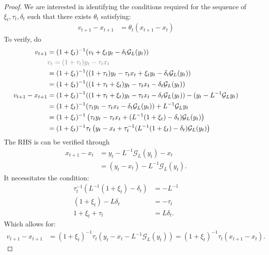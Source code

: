 \documentclass[12pt]{article}
\begin{document}
    \begin{proof}
        We are interested in identifying the conditions required for the sequence of $\xi_t, \tau_t, \delta_t$ such that there exists $\theta_t$ satisfying: 
        \begin{align*}
            v_{t + 1} - x_{t + 1} 
            &= \theta_t(x_{t + 1} - x_t)
        \end{align*}
        To verify, do 
        \begin{align*}
            v_{t + 1} &= 
            (1 + \xi_t)^{-1}(v_t + \xi_t y_t - \delta_t \mathcal G_L(y_t))
            \\
            & \textcolor{gray}{
                v_t = (1 + \tau_t)y_t - \tau_t x_t
            }
            \\
            &= 
            (1 + \xi_t)^{-1}((1 + \tau_t)y_t - \tau_t x_t + \xi_t y_t - \delta_t \mathcal G_L(y_t))
            \\
            &= 
            (1 + \xi_t)^{-1}((1 + \tau_t + \xi_t)y_t - \tau_t x_t - \delta_t \mathcal G_L(y_t))
            \\
            v_{t + 1} - x_{t + 1}
            &= 
            (1 + \xi_t)^{-1}((1 + \tau_t + \xi_t)y_t - \tau_t x_t - \delta_t \mathcal G_L(y_t))
            - (y_t - L^{-1}\mathcal G_Ly_t)
            \\
            &= 
            (1 + \xi_t)^{-1}(\tau_ty_t - \tau_t x_t - \delta_t \mathcal G_L(y_t))
            + L^{-1}\mathcal G_Ly_t
            \\
            &= 
            (1 + \xi_t)^{-1}
            \left(
                \tau_ty_t - \tau_t x_t + (L^{-1}(1 + \xi_t) - \delta_t) \mathcal G_L(y_t)
            \right)
            \\
            &= 
            (1 + \xi_t)^{-1}\tau_t
            \left(
                y_t - x_t + 
                \tau_t^{-1}(L^{-1}(1 + \xi_t) - \delta_t) \mathcal G_L(y_t)
            \right)
        \end{align*}
        The RHS is can be verified through 
        \begin{align*}
            x_{t + 1} - x_t &= 
            y_t - L^{-1}\mathcal G_L(y_t) - x_t
            \\
            &= (y_t - x_t) - L^{-1}\mathcal G_L(y_t). 
        \end{align*}
        It necessitates the condition: 
        \begin{align*}
            \tau_t^{-1}(L^{-1}(1 + \xi_t) - \delta_t) 
            &= - L^{-1}
            \\
            (1 + \xi_t) - L\delta_t
            &= 
            - \tau_t
            \\
            1 + \xi_t + \tau_t
            &=
            L\delta_t. 
        \end{align*}
        Which allows for: 
        \begin{align*}
            v_{t + 1} - x_{t + 1} &= 
            (1 + \xi_t)^{-1}\tau_t
            \left(y_t - x_t - L^{-1}\mathcal G_L(y_t)\right) 
            = 
            (1 + \xi_t)^{-1}\tau_t(x_{t + 1} - x_t). 
        \end{align*}
    \end{proof}
\end{document}
